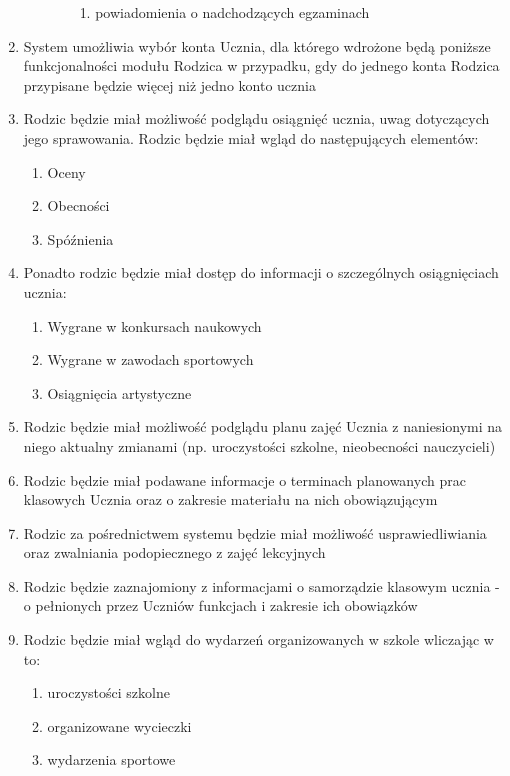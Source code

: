 \documentclass{article}
\begin{document}
\begin{enumerate}
\begin{enumerate}
\begin{enumerate}
\begin{enumerate}
				\item powiadomienia o nadchodzących egzaminach
			\end{enumerate}
		\end{enumerate} 
	\end{enumerate}
	\item System umożliwia wybór konta Ucznia, dla którego wdrożone będą poniższe funkcjonalności modułu Rodzica w przypadku, gdy do jednego konta Rodzica przypisane będzie więcej niż jedno konto ucznia
	\item Rodzic będzie miał możliwość podglądu osiągnięć ucznia, uwag dotyczących jego sprawowania. Rodzic będzie miał wgląd do następujących elementów:
	\begin{enumerate}
		\item Oceny
		\item Obecności
		\item Spóźnienia
	\end{enumerate}
	\item Ponadto rodzic będzie miał dostęp do informacji o szczególnych osiągnięciach ucznia:
	\begin{enumerate}
		\item 	Wygrane w konkursach naukowych
		\item Wygrane w zawodach sportowych
		\item Osiągnięcia artystyczne
	\end{enumerate}
	\item Rodzic będzie miał możliwość podglądu planu zajęć Ucznia z naniesionymi na niego aktualny zmianami  (np. uroczystości szkolne, nieobecności nauczycieli)
	\item Rodzic będzie miał podawane informacje o terminach planowanych prac klasowych Ucznia oraz o zakresie materiału na nich obowiązującym
	\item Rodzic za pośrednictwem systemu będzie miał możliwość usprawiedliwiania oraz zwalniania podopiecznego z zajęć lekcyjnych
	\item Rodzic będzie zaznajomiony z informacjami o samorządzie klasowym ucznia - o pełnionych przez Uczniów funkcjach i zakresie ich obowiązków
	\item Rodzic będzie miał wgląd do wydarzeń organizowanych w szkole wliczając w to:
	\begin{enumerate}
		\item uroczystości szkolne
		\item organizowane wycieczki
		\item wydarzenia sportowe
	\end{enumerate}

\end{enumerate}
\end{document}
